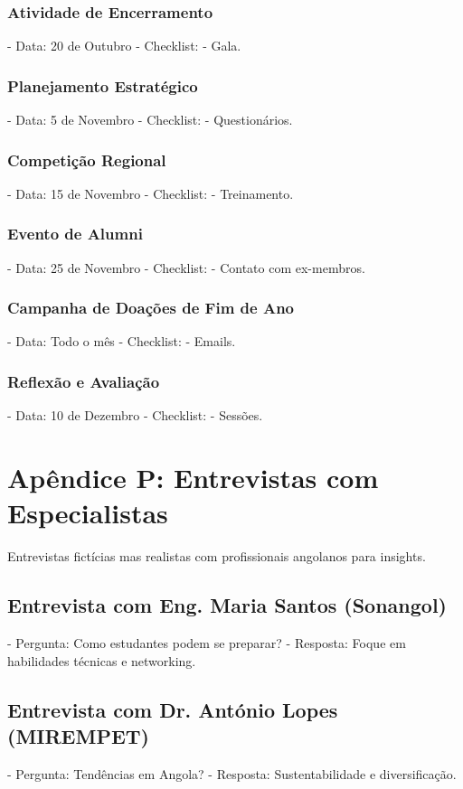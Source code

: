 \documentclass[12pt]{article}
\begin{document}
\subsubsection{Atividade de Encerramento}
- Data: 20 de Outubro
- Checklist:
  - Gala.

\subsubsection{Planejamento Estratégico}
- Data: 5 de Novembro
- Checklist:
  - Questionários.

\subsubsection{Competição Regional}
- Data: 15 de Novembro
- Checklist:
  - Treinamento.

\subsubsection{Evento de Alumni}
- Data: 25 de Novembro
- Checklist:
  - Contato com ex-membros.

\subsubsection{Campanha de Doações de Fim de Ano}
- Data: Todo o mês
- Checklist:
  - Emails.

\subsubsection{Reflexão e Avaliação}
- Data: 10 de Dezembro
- Checklist:
  - Sessões.

\section{Apêndice P: Entrevistas com Especialistas}

Entrevistas fictícias mas realistas com profissionais angolanos para insights.

\subsection{Entrevista com Eng. Maria Santos (Sonangol)}
- Pergunta: Como estudantes podem se preparar?
- Resposta: Foque em habilidades técnicas e networking.

\subsection{Entrevista com Dr. António Lopes (MIREMPET)}
- Pergunta: Tendências em Angola?
- Resposta: Sustentabilidade e diversificação.
\end{document}
